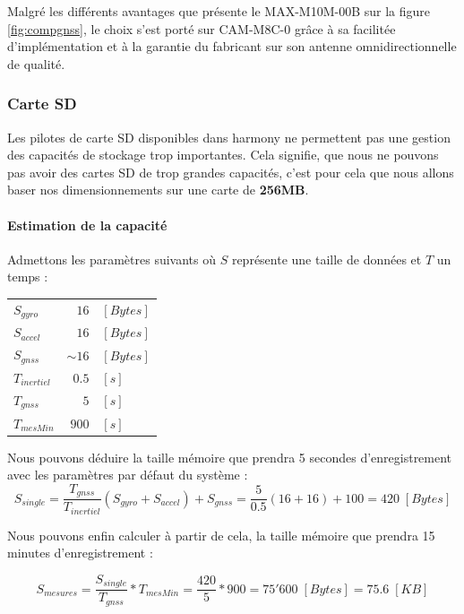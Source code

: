Malgré les différents avantages que présente le MAX-M10M-00B sur la figure \ref{fig:compgnss}, le choix s'est porté sur CAM-M8C-0 grâce à sa facilitée d'implémentation et à la garantie du fabricant sur son antenne omnidirectionnelle de qualité.

\clearpage

\subsubsection{Carte SD} 
Les pilotes de carte SD disponibles dans \gls{harmony} ne permettent pas une gestion des capacités de stockage trop importantes. Cela signifie, que nous ne pouvons pas avoir des cartes SD de trop grandes capacités, c'est pour cela que nous allons baser nos dimensionnements sur une carte de \textbf{256MB}. 

\paragraph{Estimation de la capacité} Admettons les paramètres suivants où $S$ représente une taille de données et $T$ un temps :

\begin{tabular}{lrl}
	$S_{gyro}$ & $16$ & $[Bytes]$ \\
	$S_{accel}$ & $16$ & $[Bytes]$ \\
	$S_{gnss}$ & $\sim16$ & $[Bytes]$ \\
	$T_{inertiel}$ & $0.5$ & $[s]$ \\
	$T_{gnss}$ & $5$ & $[s]$ \\
	$T_{mesMin}$ & $900$ & $[s]$ \\
\end{tabular}

Nous pouvons déduire la taille mémoire que prendra 5 secondes d'enregistrement avec les paramètres par défaut du système : 
\begin{equation*}
	S_{single} = \frac{T_{gnss}}{T_{inertiel}}(S_{gyro}+S_{accel}) + S_{gnss} = \frac{5}{0.5}(16+16) + 100 = 420 \; [Bytes]
\end{equation*}

Nous pouvons enfin calculer à partir de cela, la taille mémoire que prendra 15 minutes d'enregistrement : 

\begin{equation*}
	S_{mesures} = \frac{S_{single}}{T_{gnss}} * T_{mesMin} = \frac{420}{5} * 900 = 75'600 \; [Bytes] = 75.6 \; [KB]
\end{equation*}

